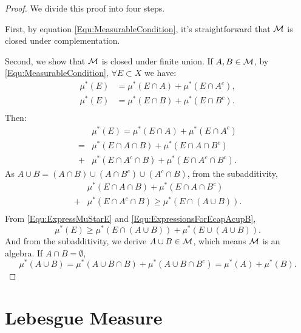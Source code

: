 \begin{proof}
    We divide this proof into four steps.
    
    First, by equation \eqref{Equ:MeasurableCondition}, it's straightforward 
    that $\mathcal{M}$ is closed under complementation. 

    Second, we show that $\mathcal{M}$ is closed under finite union. 
    If $A,B\in\mathcal{M}$, by \eqref{Equ:MeasurableCondition}, 
    $\forall E\subset X$ we have:
    \begin{equation*}
        \label{Equ:ABMeasurable}
        \begin{array}{rl}
            \mu^{*}(E)&=\mu^{*}(E\cap A)+\mu^{*}(E\cap A^c),\\
            \mu^{*}(E)&=\mu^{*}(E\cap B)+\mu^{*}(E\cap B^c).\\
        \end{array}
    \end{equation*}
    Then:
    \begin{equation}
        \label{Equ:ExpressMuStarE}
        \begin{array}{rl}
        &\mu^{*}(E)=\mu^{*}(E\cap A)+\mu^{*}(E\cap A^c)\\
        =&\mu^{*}(E\cap A\cap B)+\mu^{*}(E\cap A\cap B^c)\\
        +&\mu^{*}(E\cap A^c\cap B)+\mu^{*}(E\cap A^c\cap B^c).
        \end{array}
    \end{equation}
    As $A\cup B=(A\cap B)\cup(A\cap B^c)\cup(A^c\cap B)$, 
    from the subadditivity, 
    \begin{equation}
        \label{Equ:ExpressionsForEcapAcupB}
        \begin{array}{rl}
        &\mu^{*}(E\cap A\cap B)+\mu^{*}(E\cap A\cap B^c)\\
        +&\mu^{*}(E\cap A^c\cap B)\ge\mu^{*}(E\cap(A\cup B)).\\
        \end{array}
    \end{equation}
    From \eqref{Equ:ExpressMuStarE} and 
    \eqref{Equ:ExpressionsForEcapAcupB}, 
    \begin{displaymath}
        \mu^{*}(E)\ge\mu^{*}(E\cap (A\cup B))+\mu^{*}(E\cup (A\cup B)).
    \end{displaymath}
    And from the subadditivity, we derive $A\cup B\in\mathcal{M}$, 
    which means $\mathcal{M}$ is an algebra. If $A\cap B=\emptyset$, 
    \begin{displaymath}
        \mu^{*}(A\cup B)=\mu^{*}(A\cup B\cap B)+
        \mu^{*}(A\cup B\cap B^c)=\mu^{*}(A)+\mu^{*}(B).
    \end{displaymath}
\end{proof}
\section{Lebesgue Measure}
